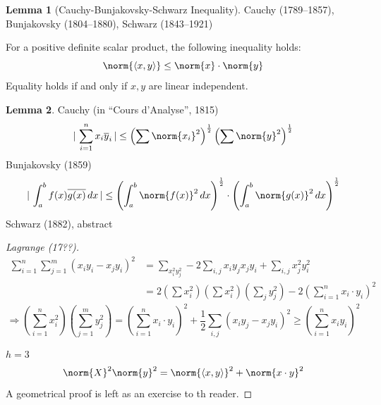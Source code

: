 \documentclass[a4paper,landscape,twocolumn]{article}
\newcommand\abs[1]{|\,#1\,|}
\newcommand\functional[1]{\left\langle{#1}\right\rangle}
\theoremstyle{definition}
\newtheorem{lemma}{Lemma}
\DeclarePairedDelimiter\norm\lVert\rVert
\begin{document}
\begin{lemma}[Cauchy-Bunjakovsky-Schwarz Inequality]
  \label{lemma-8.20}
  Cauchy (1789--1857), Bunjakovsky (1804--1880), Schwarz (1843--1921)

  For a positive definite scalar product, the following inequality holds:
  \[ \norm{\functional{x,y}} \leq \norm{x} \cdot \norm{y} \]
  Equality holds if and only if $x,y$ are linear independent.
\end{lemma}

\begin{lemma}
  Cauchy (in \enquote{Cours d'Analyse}, 1815)
  \[ \abs{\sum_{i=1}^n x_i \overline{y}_i} \leq \left(\sum \norm{x_i}^2\right)^{\frac 12} \left(\sum \norm{y}^2\right)^{\frac 12} \]
  Bunjakovsky (1859)
  \[
    \abs{\int_a^b f(x) \overline{g(x)} \, dx}
    \leq \left(\int_a^b \norm{f(x)}^2 \, dx\right)^{\frac 12} \cdot \left(\int_a^b \norm{g(x)}^2 \, dx\right)^{\frac 12}
  \]
  Schwarz (1882), abstract
\end{lemma}

\begin{proof}[Lagrange (17??)]
  \begin{align*}
    \sum_{i=1}^n \sum_{j=1}^m (x_i y_i - x_j y_i)^2
      &= \sum_{x_i^2 y_j^2} - 2 \sum_{i,j} x_i y_j x_j y_i + \sum_{i,j} x_j^2 y_i^2 \\
      &= 2 \left(\sum x_i^2\right) \left(\sum x_i^2\right) \left(\sum_j y_j^2\right) - 2 \left(\sum_{i=1}^n x_i \cdot y_i\right)^2
  \end{align*}
  \[ \Rightarrow \left(\sum_{i=1}^n x_i^2\right) \left(\sum_{j=1}^m y_j^2\right) = \left(\sum_{i=1}^n x_i \cdot y_i\right)^2 + \frac12
    \sum_{i,j} \left(x_i y_j - x_j y_i\right)^2 \geq \left(\sum_{i=1}^n x_i y_i\right)^2
  \]

  $h=3$
  \[ \norm{X}^2 \norm{y}^2 = \norm{\functional{x,y}}^2 + \norm{x \cdot y}^2 \]
  A geometrical proof is left as an exercise to th reader.
\end{proof}
\end{document}
